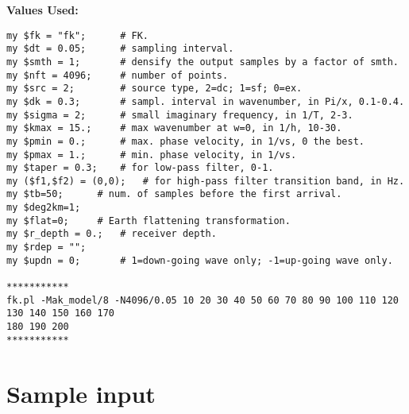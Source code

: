 \documentclass[11pt,titlepage,fleqn]{article}
\begin{document}
{\bf Values Used:}
\begin{verbatim}
my $fk = "fk";		# FK.
my $dt = 0.05;		# sampling interval.
my $smth = 1;		# densify the output samples by a factor of smth.
my $nft = 4096;		# number of points.
my $src = 2;		# source type, 2=dc; 1=sf; 0=ex.
my $dk = 0.3;		# sampl. interval in wavenumber, in Pi/x, 0.1-0.4.
my $sigma = 2;		# small imaginary frequency, in 1/T, 2-3.
my $kmax = 15.;		# max wavenumber at w=0, in 1/h, 10-30.
my $pmin = 0.;		# max. phase velocity, in 1/vs, 0 the best.
my $pmax = 1.;		# min. phase velocity, in 1/vs.
my $taper = 0.3;	# for low-pass filter, 0-1.
my ($f1,$f2) = (0,0);	# for high-pass filter transition band, in Hz.
my $tb=50;		# num. of samples before the first arrival.
my $deg2km=1;
my $flat=0;		# Earth flattening transformation.
my $r_depth = 0.;	# receiver depth.
my $rdep = "";
my $updn = 0;		# 1=down-going wave only; -1=up-going wave only.

***********
fk.pl -Mak_model/8 -N4096/0.05 10 20 30 40 50 60 70 80 90 100 110 120 130 140 150 160 170 
180 190 200
***********
\end{verbatim}


\section{Sample input}
\end{document}
